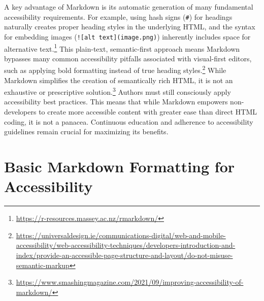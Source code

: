 A key advantage of Markdown is its automatic generation of many fundamental accessibility requirements. For example, using hash signs (\texttt{\#}) for headings naturally creates proper heading styles in the underlying HTML, and the syntax for embedding images (\texttt{![alt text](image.png)}) inherently includes space for alternative text.\footnote{\url{https://r-resources.massey.ac.nz/rmarkdown/}} This plain-text, semantic-first approach means Markdown bypasses many common accessibility pitfalls associated with visual-first editors, such as applying bold formatting instead of true heading styles.\footnote{\url{https://universaldesign.ie/communications-digital/web-and-mobile-accessibility/web-accessibility-techniques/developers-introduction-and-index/provide-an-accessible-page-structure-and-layout/do-not-misuse-semantic-markup}} While Markdown simplifies the creation of semantically rich HTML, it is not an exhaustive or prescriptive solution.\footnote{\url{https://www.smashingmagazine.com/2021/09/improving-accessibility-of-markdown/}} Authors must still consciously apply accessibility best practices. This means that while Markdown empowers non-developers to create more accessible content with greater ease than direct HTML coding, it is not a panacea. Continuous education and adherence to accessibility guidelines remain crucial for maximizing its benefits.

\section{Basic Markdown Formatting for Accessibility}

